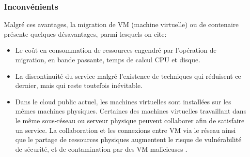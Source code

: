\subsubsection{Inconvénients}
Malgré ces avantages, la migration de VM (machine virtuelle) ou de contenaire présente quelques désavantages, parmi lesquels on cite:
\begin{itemize}
  \item Le coût en consommation de ressources engendré par l'opération de migration, en bande passante, temps de calcul CPU et disque.
  \item La discontinuité du service malgré l'existence de techniques qui réduisent ce dernier, mais qui reste toutefois inévitable.
  \item Dans le cloud public actuel, les machines virtuelles sont installées sur les mêmes machines physiques. Certaines des machines virtuelles travaillant dans le même sous-réseau ou serveur physique peuvent collaborer afin de satisfaire un service. La collaboration et les connexions entre VM via le réseau ainsi que le partage de ressources physiques augmentent le risque de vulnérabilité de sécurité, et de contamination par des VM malicieuses \cite{chandrakala2018}.
\end{itemize}

